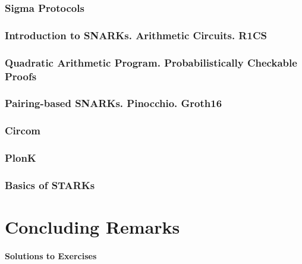 \documentclass{zkdl-template}
\begin{document}
    \section{Sigma Protocols}\label{section:sigma}
    

    \section[Arithmetic Circuits. R1CS]{Introduction to SNARKs. Arithmetic Circuits. R1CS} \label{section:r1cs}
    \label{section:circuits}

    \section[Quadratic Arithmetic Program]{Quadratic Arithmetic Program. Probabilistically Checkable Proofs}\label{section:qap-pcp}
    

    \section[Pairing-based SNARKs]{Pairing-based SNARKs. Pinocchio. Groth16}\label{section:groth}
    

    \section{Circom}\label{section:circom}
    

    \section{PlonK}\label{section:plonk}
    

    \section{Basics of STARKs}\label{section:stark}
    

    \part{Concluding Remarks}\label{section:solutions}
    \subsection*{Solutions to Exercises}
    
\end{document}
